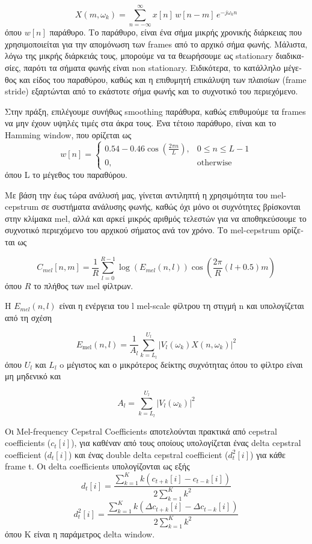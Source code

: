 \documentclass[a4paper,11pt]{article}
\begin{document}
\[X(m,\omega_k) = \sum_{n=-\infty}^{\infty} x[n]\, w[n - m] \, e^{-j\omega_k n}\]
\textgreek{όπου }$w[n]$ \textgreek{παράθυρο. Το παράθυρο, είναι ένα σήμα μικρής χρονικής διάρκειας που χρησιμοποιείται για την απομόνωση των }frames \textgreek{από το αρχικό σήμα φωνής. Μάλιστα, λόγω της μικρής διάρκειάς τους, μπορούμε να τα θεωρήσουμε ως }stationary \textgreek{διαδικασίες, παρότι τα σήματα φωνής είναι }non stationary. \textgreek{Ειδικότερα, το κατάλληλο μέγεθος και είδος του παραθύρου, καθώς και η επιθυμητή επικάλυψη των πλαισίων }(frame stride) \textgreek{εξαρτώνται από το εκάστοτε σήμα φωνής και το συχνοτικό του περιεχόμενο.}

\textgreek{Στην πράξη, επιλέγουμε συνήθως }smoothing \textgreek{παράθυρα, καθώς επιθυμούμε τα }frames \textgreek{να μην έχουν υψηλές τιμές στα άκρα τους. Ένα τέτοιο παράθυρο, είναι και το }Hamming window, \textgreek{που ορίζεται ως}
\[w[n] =
\begin{cases}
0.54 - 0.46 \cos\left(\frac{2\pi n}{L}\right), & 0 \le n \le L-1 \\
0, & \text{otherwise}
\end{cases}\]
\textgreek{όπου }L\textgreek{ το μέγεθος του παραθύρου.}

\textgreek{Με βάση την έως τώρα ανάλυσή μας, γίνεται αντιληπτή η χρησιμότητα του }mel-cepstrum \textgreek{σε συστήματα ανάλυσης φωνής, καθώς όχι μόνο οι συχνότητες βρίσκονται στην κλίμακα }mel, \textgreek{αλλά και αρκεί μικρός αριθμός τελεστών για να αποθηκεύσουμε το συχνοτικό περιεχόμενο του αρχικού σήματος ανά τον χρόνο. Το }mel-cepstrum \textgreek{ορίζεται ως}

\[C_{mel}[n,m] =\dfrac{1}{R} \sum_{l=0}^{R-1} \log\left(E_{mel}(n,l)\right)\cos\left(\frac{2\pi}{R}(l + 0.5)m\right)\]
\textgreek{όπου }$R$ \textgreek{το πλήθος των }mel \textgreek{φίλτρων.}

\textgreek{Η }$E_{mel}(n, l)$ \textgreek{είναι η ενέργεια του }l mel-scale \textgreek{φίλτρου τη στιγμή }n \textgreek{και υπολογίζεται από τη σχέση}

\[E_{\mathrm{mel}}(n, l) = \dfrac{1}{A_l}\sum_{k=L_l}^{U_l} |V_l(\omega _k )X(n,\omega _k)|^2 \]
\textgreek{όπου }$U_l$ \textgreek{και} $L_l$ \textgreek{o μέγιστος και ο μικρότερος δείκτης συχνότητας όπου το φίλτρο είναι μη μηδενικό και}

\[A_l=\sum_{k=L_l}^{U_l} |V_l(\omega _k )|^2 \]

\textgreek{Οι }Mel-frequency Cepstral Coefficients \textgreek{αποτελούνται πρακτικά από }cepstral coefficients ($c_t[i]$), \textgreek{για καθέναν από τους οποίους υπολογίζεται ένας} delta cepstral coefficient ($d_t[i]$) \textgreek{και ένας }double delta cepstral coefficient ($d_{t}^2[i]$) \textgreek{για κάθε }frame t. \textgreek{Οι } delta coefficients \textgreek{υπολογίζονται ως εξής}
\[d_t[i] = \frac{\sum_{k=1}^{K} k \left(c_{t+k}[i] - c_{t-k}[i]\right)}{2 \sum_{k=1}^{K} k^2}\]
\[d_{t}^2[i] = \frac{\sum_{k=1}^{K} k \left(\Delta c_{t+k}[i] - \Delta c_{t-k}[i]\right)}{2 \sum_{k=1}^{K} k^2}\]
\textgreek{όπου }K \textgreek{είναι η παράμετρος }delta window.
\end{document}
